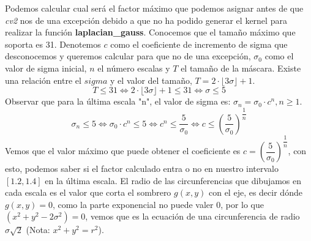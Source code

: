 \documentclass{article}
\begin{document}
Podemos calcular cual será el factor máximo que podemos asignar antes de que \textit{cv2} nos de una excepción debido a que no ha podido generar el kernel para realizar la función \textbf{laplacian\_gauss}. Conocemos que el tamaño máximo que soporta es 31. Denotemos $c$ como el coeficiente de incremento de sigma que desconocemos y queremos calcular para que no de una excepción, $\sigma_0$ como el valor de sigma inicial, $n$ el número escalas y $T$ el tamaño de la máscara.
\newline
Existe una relación entre el $sigma$ y el valor del tamaño, $T = 2\cdot\lfloor3\sigma\rfloor+1$.
$$ T \le 31 \Leftrightarrow  2\cdot\lfloor3\sigma\rfloor+1 \le 31 \Leftrightarrow \sigma \le 5 $$
Observar que para la última escala "n", el valor de sigma es: $ \sigma_n=\sigma_0\cdot c^n, n\ge 1$.
$$ \sigma_n \le 5 \Leftrightarrow \sigma_0\cdot c^n \le 5 \Leftrightarrow c^n \le \dfrac{5}{\sigma_0} \Leftrightarrow c \le \left(\dfrac{5}{\sigma_0}\right)^{\dfrac{1}{n}}$$
Vemos que el valor máximo que puede obtener el coeficiente es $c=\left(\dfrac{5}{\sigma_0}\right)^{\dfrac{1}{n}}$, con esto, podemos saber si el factor calculado entra o no en nuestro intervalo $\left[1.2, 1.4\right]$ en la última escala.
\newline
\newline
El radio de las circunferencias que dibujamos en cada escala es el valor que corta el sombrero $g(x,y)$ con el eje, es decir dónde $g(x,y)=0$, como la parte exponencial no puede valer 0, por lo que $(x^2+y^2-2\sigma^2)=0$, vemos que es la ecuación de una circunferencia de radio $\sigma\sqrt{2}$ (Nota: $x^2+y^2=r^2$).

\newpage
\end{document}
